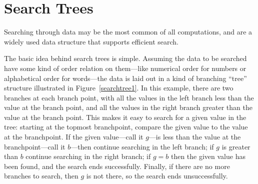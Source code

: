 \newcommand{\brnch}{\text{BBTr}}
\newcommand{\leafp}[1]{\text{leaf?}#1}
\newcommand{\brnchng}{\text{Branching}}
\newcommand{\leafset}{\text{Leaves}}
\newcommand{\rightsub}[1]{\text{right}#1}
\newcommand{\leftsub}[1]{\text{left}#1}
\newcommand{\rslt}[2]{\text{subtree}_{#1}#2}
\newcommand{\subbrn}[1]{\text{Subtrs}(#1)}
\newcommand{\propbrn}[1]{\text{PropSubtrs}(#1)}

\newcommand{\fintr}{\text{FinTr}}

\newcommand{\rectr}{\text{RecTr}}

\newcommand{\trdpth}[1]{\text{recdepth}#1}
\newcommand{\trsize}[1]{\text{recsize}#1}

\newcommand{\nlbl}[1]{\text{num}#1}
\newcommand{\rmin}[1]{\text{recmin}#1}

\newcommand{\trsrch}[1]{\text{srch}#1}


\section{Search Trees}

Searching through data may be the most common of all computations, and
 are a widely used data structure that supports
efficient search.

The basic idea behind search trees is simple.  Assuming the data to be
searched have some kind of order relation on them---like numerical order
for numbers or alphabetical order for words---the data is laid out in
a kind of branching ``tree'' structure illustrated in
Figure~\ref{searchtree1}.  In this example, there are two branches at
each branch point, with all the values in the left branch less than
the value at the branch point, and all the values in the right branch
greater than the value at the branch point.  This makes it easy to
search for a given value in the tree: starting at the topmost
branchpoint, compare the given value to the value at the branchpoint.
If the given value---call it $g$---is less than the value at the
branchpoint---call it $b$---then continue searching in the left
branch; if $g$ is greater than $b$ continue searching in the right
branch; if $g = b$ then the given value has been found, and the search
ends successfully.  Finally, if there are no more branches to search,
then $g$ is not there, so the search ends unsuccessfully.

